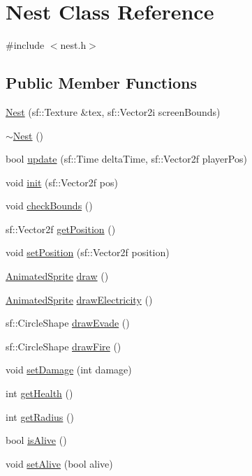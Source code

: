 \hypertarget{class_nest}{}\section{Nest Class Reference}
\label{class_nest}


{\ttfamily \#include $<$nest.\+h$>$}

\subsection*{Public Member Functions}
\begin{DoxyCompactItemize}
\item 
\hyperlink{class_nest_af88d2bfa6f9d0b0c48982ff54fe31cf9}{Nest} (sf\+::\+Texture \&tex, sf\+::\+Vector2i screen\+Bounds)
\item 
\hyperlink{class_nest_a3e879ba15acd31717b1dc9bdc87488d5}{$\sim$\+Nest} ()
\item 
bool \hyperlink{class_nest_a90efe6e30a891f7dd0620d4f14c3cef6}{update} (sf\+::\+Time delta\+Time, sf\+::\+Vector2f player\+Pos)
\item 
void \hyperlink{class_nest_a1b243050144c8b5200bd3e8a4370565a}{init} (sf\+::\+Vector2f pos)
\item 
void \hyperlink{class_nest_ad3c58a10bcb55df97a6d0e7923924f0b}{check\+Bounds} ()
\item 
sf\+::\+Vector2f \hyperlink{class_nest_a3904c58d1826997b98bdfd8b357ba6fa}{get\+Position} ()
\item 
void \hyperlink{class_nest_a483c559f957838c28d613fddad8b99f3}{set\+Position} (sf\+::\+Vector2f position)
\item 
\hyperlink{class_animated_sprite}{Animated\+Sprite} \hyperlink{class_nest_a6e4950498b1c767c513e1a5fac4259e5}{draw} ()
\item 
\hyperlink{class_animated_sprite}{Animated\+Sprite} \hyperlink{class_nest_ad90f39c39a435c3cb2702880b624d254}{draw\+Electricity} ()
\item 
sf\+::\+Circle\+Shape \hyperlink{class_nest_a69a224e6296dadbeee744697d308259c}{draw\+Evade} ()
\item 
sf\+::\+Circle\+Shape \hyperlink{class_nest_a3118b2257f6864632abf907c42af94fd}{draw\+Fire} ()
\item 
void \hyperlink{class_nest_a2a5904049fbb094af9f79ec55a5be9d6}{set\+Damage} (int damage)
\item 
int \hyperlink{class_nest_a31a181f820acdcc53c5c0954ec57bdd2}{get\+Health} ()
\item 
int \hyperlink{class_nest_a83653533eadad995b464a8a068257fe8}{get\+Radius} ()
\item 
bool \hyperlink{class_nest_a3f0d0175e349409ef2cab7e9bae0fb81}{is\+Alive} ()
\item 
void \hyperlink{class_nest_a122840333f4f0d0f5acd2815b0f633ca}{set\+Alive} (bool alive)
\end{DoxyCompactItemize}


